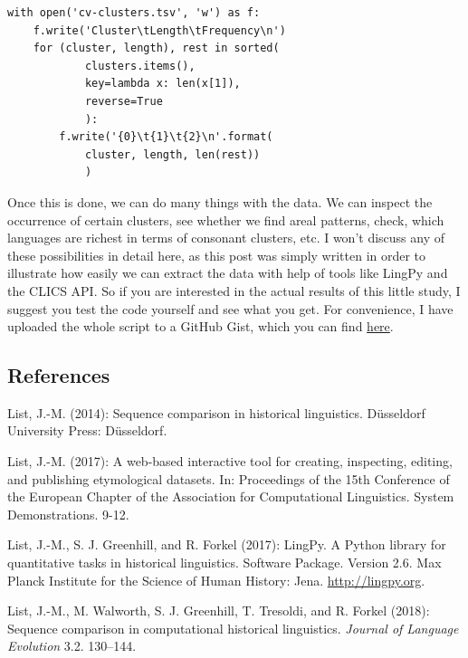 \documentclass[
  a4paper,
  14pt,
  oneside,
  tablecaptionabove
]{scrbook}
\begin{document}
\begin{lstlisting}
with open('cv-clusters.tsv', 'w') as f:
    f.write('Cluster\tLength\tFrequency\n')
    for (cluster, length), rest in sorted(
            clusters.items(), 
            key=lambda x: len(x[1]),
            reverse=True
            ):
        f.write('{0}\t{1}\t{2}\n'.format(
            cluster, length, len(rest))
            )
\end{lstlisting}

Once this is done, we can do many things with the data. We can inspect
the occurrence of certain clusters, see whether we find areal patterns,
check, which languages are richest in terms of consonant clusters, etc.
I won't discuss any of these possibilities in detail here, as this post
was simply written in order to illustrate how easily we can extract the
data with help of tools like LingPy and the CLICS API. So if you are
interested in the actual results of this little study, I suggest you
test the code yourself and see what you get. For convenience, I have
uploaded the whole script to a GitHub Gist, which you can find
\href{https://gist.github.com/LinguList/1056960125ca79428b420257fa4b02eb}{here}.

\subsection*{References}

\nopagebreak\hangindent=0.7cm {\small List, J.-M. (2014): {Sequence comparison in historical
linguistics}.  Düsseldorf University Press: Düsseldorf. }

\nopagebreak\hangindent=0.7cm {\small List, J.-M. (2017): {A web-based interactive tool for creating,
inspecting, editing, and publishing etymological datasets}.  In:
{Proceedings of the 15th Conference of the European Chapter of
the Association for Computational Linguistics. System Demonstrations}. 
9-12. }

\nopagebreak\hangindent=0.7cm {\small List, J.-M., S. J. Greenhill, and R. Forkel (2017): {LingPy. A
Python library for quantitative tasks in historical linguistics}. 
Software Package. Version 2.6. Max Planck Institute for the Science of
Human History: Jena. \href{//lingpy.org”}{http://lingpy.org}.  }

\nopagebreak\hangindent=0.7cm {\small List, J.-M., M. Walworth, S. J. Greenhill, T. Tresoldi, and R. Forkel
(2018): {Sequence comparison in computational historical
linguistics}.  \emph{Journal of Language Evolution} 3.2. 130--144. }
\end{document}

